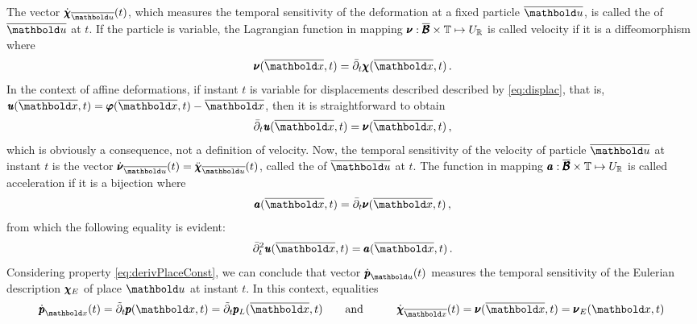 The vector $\dot{\tnr{\chi}}_{\overline{\vto{u}}}(t)$, which measures the temporal sensitivity of the deformation at a fixed particle $\overline{\vto{u}}$, is called the  of $\overline{\vto{u}}$ at $t$. If the particle is variable, the Lagrangian function in mapping ${\pmb{\nu}} : \overline{\pmb{\mathcal{B}}}\times\mathbb{T} \mapsto U_{\mathbb{R}}$ is called velocity if it is a diffeomorphism where 
\begin{equation}
{\tnr{\nu}}(\overline{\vto{x}},t)=\bar{\partial}_t\tnr{\chi}(\overline{\vto{x}},t)\,.
\end{equation}
In the context of affine deformations, if instant $t$ is variable for displacements described described by \eqref{eq:displac}, that is, $\fua{\tnr{\mathit{u}}}{\overline{\vto{x}},t}=\fua{\tnr{\varphi}}{\overline{\vto{x}},t} - \overline{\vto{x}}$, then it is straightforward to obtain 
\begin{equation}
\bar{\partial}_t\fua{\tnr{\mathit{u}}}{\overline{\vto{x}},t} =  {\tnr{\nu}}(\overline{\vto{x}},t)\,,
\end{equation}
which is obviously a consequence, not a definition of velocity. Now, the temporal sensitivity of the velocity of particle $\overline{\vto{u}}$ at instant $t$ is the vector $\dot{\tnr{\nu}}_{\overline{\vto{u}}}(t)=\ddot{\tnr{\chi}}_{\overline{\vto{u}}}(t)$, called the  of $\overline{\vto{u}}$ at $t$. The function in mapping ${\pmb{a}} : \overline{\pmb{\mathcal{B}}}\times\mathbb{T} \mapsto U_{\mathbb{R}}$ is called acceleration if it is a bijection where
\begin{equation}
{\tnr{a}}(\overline{\vto{x}},t)=\bar{\partial}_t\tnr{\nu}(\overline{\vto{x}},t)\,,
\end{equation}
from which the following equality is evident:
\begin{equation}
\bar{\partial}_t^2\fua{\tnr{\mathit{u}}}{\overline{\vto{x}},t} =  {\tnr{a}}(\overline{\vto{x}},t)\,.
\end{equation}
Considering property \eqref{eq:derivPlaceConst}, we can conclude that vector $\dot{\tnr{p}}_{{\vto{u}}}(t)$ measures the temporal sensitivity of the Eulerian description $\pmb{\chi}_E$ of place $\vto{u}$ at instant $t$. In this context, equalities
\begin{alignat*}{3} 
\dot{\tnr{p}}_{{\vto{x}}}(t) = \tilde{\partial}_t \tnr{p}(\vto{x},t) = \tilde{\partial}_t \tnr{p}_L(\overline{\vto{x}},t)&\qquad \text{and}\qquad & \dot{\tnr{\chi}}_{\overline{\vto{x}}}(t) = \tnr{\nu}(\overline{\vto{x}},t) = \tnr{\nu}_E({\vto{x}},t)\,
\end{alignat*}
